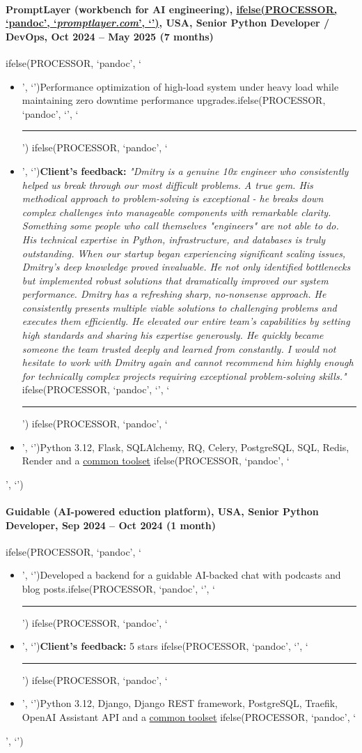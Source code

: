 \documentclass[a4paper,8pt]{extarticle}
\newcommand{\chref}[2]{\href{#1}
{ifelse(PROCESSOR, `pandoc', `#2', `\underline{\smash{#2}}')}}
\newcommand{\itchref}[2]{\chref{#1}{\textit{#2}}}  %
\newcommand{\chrule}{ifelse(PROCESSOR, `pandoc', `', `\vspace{3pt}\hrule')}
\newcommand{\pdbeginitemize}{ifelse(PROCESSOR, `pandoc', `\begin{itemize}', `')}
\newcommand{\pditem}{ifelse(PROCESSOR, `pandoc', `\item', `')}
\newcommand{\pdenditemize}{ifelse(PROCESSOR, `pandoc', `\end{itemize}', `')}
\begin{document}
\paragraph*{PromptLayer (workbench for AI engineering), \itchref{https://promptlayer.com}{promptlayer.com}, USA, Senior Python Developer / DevOps, Oct 2024 -- May 2025 (7 months)}
\pdbeginitemize
\pditem Performance optimization of high-load system under heavy load while maintaining zero downtime performance upgrades.\chrule
\pditem \textbf{Client's feedback:} \textit{"Dmitry is a genuine 10x engineer who consistently helped us break through our most difficult problems. A true gem. His methodical approach to problem-solving is exceptional - he breaks down complex challenges into manageable components with remarkable clarity. Something some people who call themselves "engineers" are not able to do. His technical expertise in Python, infrastructure, and databases is truly outstanding. When our startup began experiencing significant scaling issues, Dmitry's deep knowledge proved invaluable. He not only identified bottlenecks but implemented robust solutions that dramatically improved our system performance. Dmitry has a refreshing sharp, no-nonsense approach. He consistently presents multiple viable solutions to challenging problems and executes them efficiently. He elevated our entire team's capabilities by setting high standards and sharing his expertise generously. He quickly became someone the team trusted deeply and learned from constantly. I would not hesitate to work with Dmitry again and cannot recommend him highly enough for technically complex projects requiring exceptional problem-solving skills."}
\chrule
\pditem Python 3.12, Flask, SQLAlchemy, RQ, Celery, PostgreSQL, SQL, Redis, Render and a \hyperlink{common-toolset}{common toolset}
\pdenditemize

\paragraph*{Guidable (AI-powered eduction platform), USA, Senior Python Developer, Sep 2024 -- Oct 2024 (1 month)}
\pdbeginitemize
\pditem Developed a backend for a guidable AI-backed chat with podcasts and blog posts.\chrule
\pditem \textbf{Client's feedback:} 5 stars
\chrule
\pditem Python 3.12, Django, Django REST framework, PostgreSQL, Traefik, OpenAI Assistant API and a \hyperlink{common-toolset}{common toolset}
\pdenditemize
\end{document}
